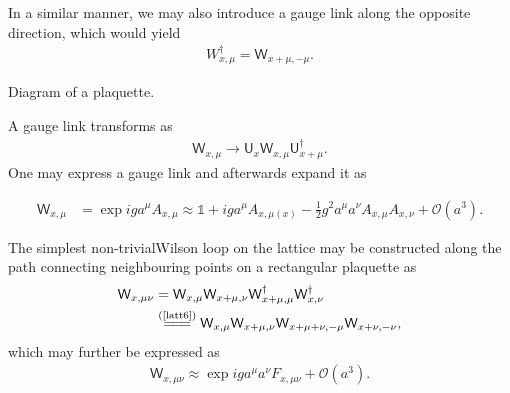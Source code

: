\begin{note}
In a similar manner, we may also introduce a gauge link along the opposite direction, which would yield
\begin{align}\label{latt6}
    W_{x,\mu}^{\dagger}=\textsf{W}_{x+\mu,-\mu}.
\end{align}

\begin{marginfigure}[-5.5cm]
	\centering
    
    \caption*{Diagram of a plaquette.}
\end{marginfigure}

A gauge link transforms as
\begin{align*}
    \textsf{W}_{x, \mu} \rightarrow \textsf{U}_{x} \textsf{W}_{x, \mu} \textsf{U}_{x+\mu}^{\dagger}.
\end{align*}
One may express a gauge link and afterwards expand it as
\begin{fullwidth}
\begin{equation}
    \begin{aligned}\label{latt7}
     \textsf{W}_{x,\mu}&=\exp{iga^\mu A_{x,\mu}}\approx \mathds{1}+iga^\mu A_{x,\mu(x)}-\frac{1}{2}g^2a^\mu a^\nu A_{x,\mu}A_
     {x,\nu}+\mathcal{O}(a^3).
\end{aligned}
\end{equation}
\end{fullwidth}

\end{note}
The simplest non-trivialWilson loop on the lattice may be constructed along the path connecting neighbouring points on a rectangular {\sffamily\color{ming}plaquette} as
\begin{align*}
    \textsf{W}_{x, \mu \nu}&=\textsf{W}_{x, \mu} \textsf{W}_{x+\mu, \nu} \textsf{W}^\dagger_{x+\mu,\mu}\textsf{W}^\dagger_{x,\nu}\\
    &\stackrel{(\text{\cref{latt6}})}{=\joinrel=\joinrel=}\textsf{W}_{x, \mu} \textsf{W}_{x+\mu, \nu} \textsf{W}_{x+\mu+\nu,-\mu} \textsf{W}_{x+\nu,-\nu},
\end{align*}
which may further be expressed as
\begin{align*}
    \textsf{W}_{x, \mu \nu} \approx \exp{ig a^{\mu} a^{\nu} F_{x,\mu \nu}+\mathcal{O}\left(a^{3}\right)}.
\end{align*}

